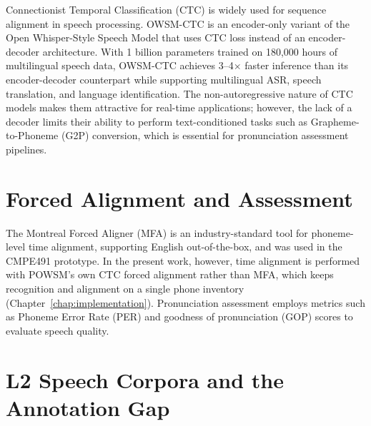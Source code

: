 \documentclass[a4paper,12pt]{report}
\begin{document}
Connectionist Temporal Classification (CTC) \cite{graves2006connectionist} is widely used for sequence alignment in speech processing. OWSM-CTC \cite{owsmctc} is an encoder-only variant of the Open Whisper-Style Speech Model that uses CTC loss instead of an encoder-decoder architecture. With 1 billion parameters trained on 180,000 hours of multilingual speech data, OWSM-CTC achieves 3--4$\times$ faster inference than its encoder-decoder counterpart while supporting multilingual ASR, speech translation, and language identification. The non-autoregressive nature of CTC models makes them attractive for real-time applications; however, the lack of a decoder limits their ability to perform text-conditioned tasks such as Grapheme-to-Phoneme (G2P) conversion, which is essential for pronunciation assessment pipelines.

\section{Forced Alignment and Assessment}

The Montreal Forced Aligner (MFA) \cite{mcauliffe2017montreal} is an industry-standard tool for phoneme-level time alignment, supporting English out-of-the-box, and was used in the CMPE491 prototype. In the present work, however, time alignment is performed with POWSM's own CTC forced alignment rather than MFA, which keeps recognition and alignment on a single phone inventory (Chapter~\ref{chap:implementation}). Pronunciation assessment employs metrics such as Phoneme Error Rate (PER) and goodness of pronunciation (GOP) scores \cite{witt2000phone} to evaluate speech quality.

\section{L2 Speech Corpora and the Annotation Gap}
\label{sec:data-gap}
\end{document}
